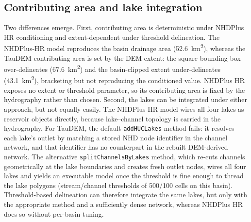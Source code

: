 \subsection{Contributing area and lake integration}
Two differences emerge.
First, contributing area is deterministic under NHDPlus HR conditioning and extent-dependent under threshold delineation.
The NHDPlus-HR model reproduces the basin drainage area (52.6~km\textsuperscript{2}), whereas the TauDEM contributing area is set by the DEM extent: the square bounding box over-delineates (67.6~km\textsuperscript{2}) and the basin-clipped extent under-delineates (43.1~km\textsuperscript{2}), bracketing but not reproducing the conditioned value.
NHDPlus HR exposes no extent or threshold parameter, so its contributing area is fixed by the hydrography rather than chosen.
Second, the lakes can be integrated under either approach, but not equally easily.
The NHDPlus-HR model wires all four lakes as reservoir objects directly, because lake--channel topology is carried in the hydrography.
For TauDEM, the default \texttt{addHUCLakes} method fails: it resolves each lake's outlet by matching a stored NHD node identifier in the channel network, and that identifier has no counterpart in the rebuilt DEM-derived network.
The alternative \texttt{splitChannelsByLakes} method, which re-cuts channels geometrically at the lake boundaries and creates fresh outlet nodes, wires all four lakes and yields an executable model once the threshold is fine enough to thread the lake polygons (stream/channel thresholds of 500/100 cells on this basin).
Threshold-based delineation can therefore integrate the same lakes, but only with the appropriate method and a sufficiently dense network, whereas NHDPlus HR does so without per-basin tuning.

